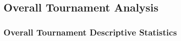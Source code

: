\documentclass[12pt]{report}
\begin{document}
\newpage
\subsection{Overall Tournament Analysis}


\subsubsection{Overall Tournament Descriptive Statistics}










\clearpage
\end{document}
